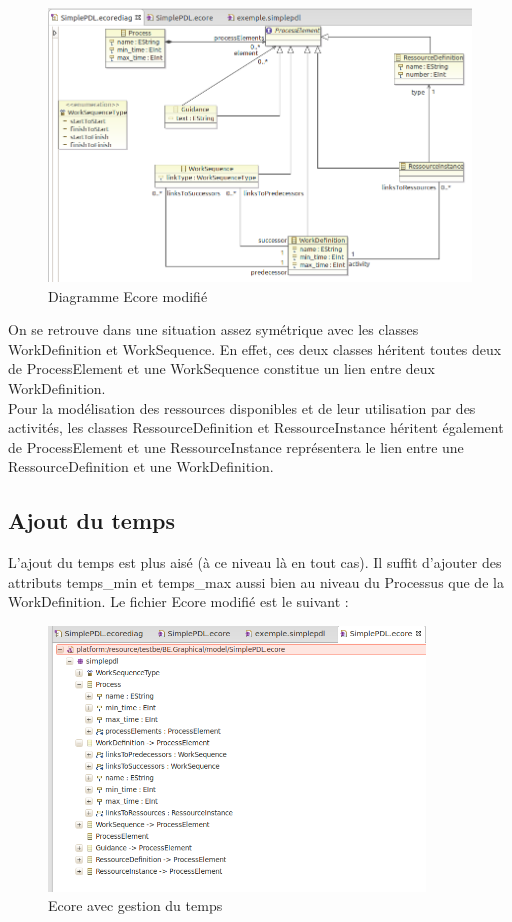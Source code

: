 \documentclass{report}
\begin{document}
\begin{figure}[!h] 
\begin{center}
\includegraphics[width=15cm]{Capture-4.png}
\caption{Diagramme Ecore modifié} 
\label{img1} 
\end{center}
\end{figure} 

On se retrouve dans une situation assez symétrique avec les classes WorkDefinition et WorkSequence. En effet, ces deux classes héritent toutes deux de ProcessElement et une WorkSequence constitue un lien entre deux WorkDefinition.\\

Pour la modélisation des ressources disponibles et de leur utilisation par des activités, les classes RessourceDefinition et RessourceInstance héritent également de ProcessElement et une RessourceInstance représentera le lien entre une RessourceDefinition et une WorkDefinition.

\subsection{Ajout du temps}

L'ajout du temps est plus aisé (à ce niveau là en tout cas). Il suffit d'ajouter des attributs temps\_min et temps\_max aussi bien au niveau du Processus que de la WorkDefinition. Le fichier Ecore modifié est le suivant :\\

\begin{figure}[!h] 
\begin{center}
\includegraphics[width=10cm]{Capture-5.png}
\caption{Ecore avec gestion du temps} 
\label{img1} 
\end{center}
\end{figure} 
\end{document}
